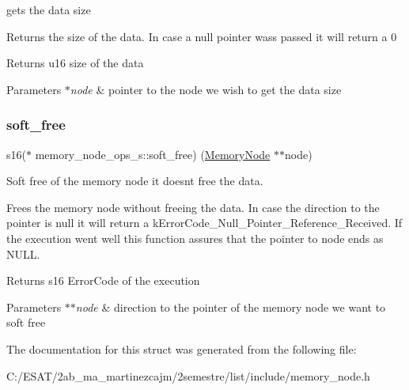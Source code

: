 gets the data size 

Returns the size of the data. In case a null pointer wass passed it will return a 0

\begin{DoxyReturn}{Returns}
u16 size of the data 
\end{DoxyReturn}

\begin{DoxyParams}{Parameters}
{\em $\ast$node} & pointer to the node we wish to get the data size \\
\hline
\end{DoxyParams}
\mbox{\label{structmemory__node__ops__s_a51993e6d5aeb1025181ba5ae46e9f0a8}} 
\subsubsection{\texorpdfstring{soft\+\_\+free}{soft\_free}}
{\footnotesize\ttfamily s16($\ast$ memory\+\_\+node\+\_\+ops\+\_\+s\+::soft\+\_\+free) (\hyperlink{structmemory__node__s}{Memory\+Node} $\ast$$\ast$node)}



Soft free of the memory node it doesn\textquotesingle{}t free the data. 

Frees the memory node without freeing the data. In case the direction to the pointer is null it will return a k\+Error\+Code\+\_\+\+Null\+\_\+\+Pointer\+\_\+\+Reference\+\_\+\+Received. If the execution went well this function assures that the pointer to node ends as N\+U\+LL.

\begin{DoxyReturn}{Returns}
s16 Error\+Code of the execution 
\end{DoxyReturn}

\begin{DoxyParams}{Parameters}
{\em $\ast$$\ast$node} & direction to the pointer of the memory node we want to soft free \\
\hline
\end{DoxyParams}


The documentation for this struct was generated from the following file\+:\begin{DoxyCompactItemize}
\item 
C\+:/\+E\+S\+A\+T/2ab\+\_\+ma\+\_\+martinezcajm/2semestre/list/include/memory\+\_\+node.\+h\end{DoxyCompactItemize}
